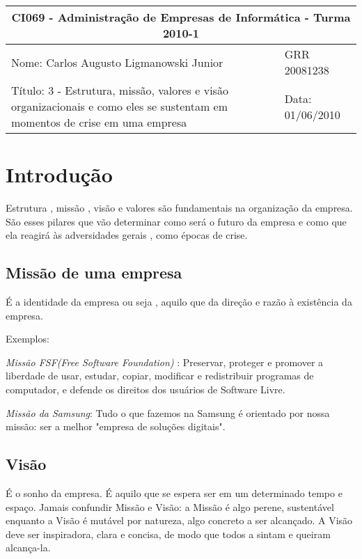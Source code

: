 \documentclass[11pt]{article}
\begin{document}
\setlength{\parskip}{2ex}

\begin{tabular}[l]{ | p{10cm} | l | } 
  \hline
  \multicolumn{2}{|c|}{CI069 - Administração de Empresas de Informática - Turma 2010-1} \\
  \hline 
  Nome: Carlos Augusto Ligmanowski Junior & 
  GRR 20081238 \\
  \hline 
  Título: 3 - Estrutura, missão, valores e visão organizacionais e como eles se sustentam em momentos de crise em uma empresa & 
  Data: 01/06/2010 \\
  \hline 
\end{tabular}

\vspace{1cm}

\section{Introdução}

Estrutura , missão , visão e valores são fundamentais na organização da empresa. São esses pilares que vão determinar como será o futuro da empresa e como que ela reagirá às adversidades gerais , como épocas de crise. 

\subsection{Missão de uma empresa}

É a identidade da empresa ou seja , aquilo que da direção e razão à existência da empresa.

Exemplos:

\textit{Missão FSF(Free Software Foundation) }: Preservar, proteger e promover a liberdade de usar, estudar, copiar, modificar e redistribuir programas de computador, e defende os direitos dos usuários de Software Livre. 

\textit{Missão da Samsung}: Tudo o que fazemos na Samsung é orientado por nossa missão: ser a melhor "empresa de soluções digitais". 

\subsection{Visão}

É o sonho da empresa. É aquilo que se espera ser em um determinado tempo e espaço. Jamais confundir Missão e Visão: a Missão é algo perene, sustentável enquanto a Visão é mutável por natureza, algo concreto a ser alcançado. A Visão deve ser inspiradora, clara e concisa, de modo que todos a sintam e queiram alcança-la.
\end{document}
